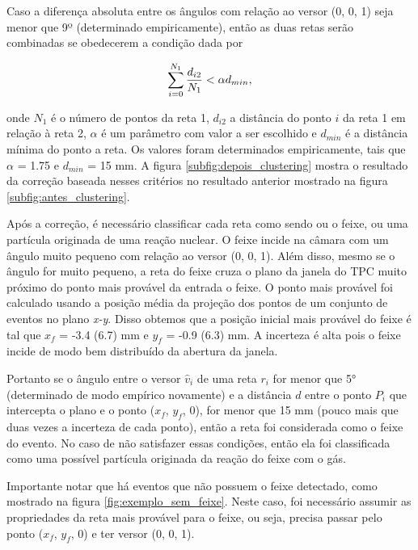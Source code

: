 \documentclass[a4paper,12pt,oneside]{book}
\begin{document}
\par Caso a diferença absoluta entre os ângulos com relação ao versor (0, 0, 1) seja menor que 9º (determinado empiricamente), então as duas retas serão combinadas se obedecerem a condição dada por

\begin{equation}\label{criterio_clustering}
    \sum_{i = 0}^{N_1}\frac{d_{i2}}{N_1} < \alpha \space d_{min}, 
\end{equation}

onde $N_1$ é o número de pontos da reta 1, $d_{i2}$ a distância do ponto $i$ da reta 1 em relação à reta 2, $\alpha$ é um parâmetro com valor a ser escolhido e $d_{min}$ é a distância mínima do ponto a reta. Os valores foram determinados empiricamente, tais que $\alpha$ = 1.75 e $d_{min}$ = 15 mm. A figura \ref{subfig:depois_clustering} mostra o resultado da correção baseada nesses critérios no resultado anterior mostrado na figura \ref{subfig:antes_clustering}.

\par Após a correção, é necessário classificar cada reta como sendo ou o feixe, ou uma partícula originada de uma reação nuclear. O feixe incide na câmara com um ângulo muito pequeno com relação ao versor (0, 0, 1). Além disso, mesmo se o ângulo for muito pequeno, a reta do feixe cruza o plano da janela do TPC muito próximo do ponto mais provável da entrada o feixe. O ponto mais provável foi calculado usando a posição média da projeção dos pontos de um conjunto de eventos no plano \textit{x-y}. Disso obtemos que a posição inicial mais provável do feixe é tal que $x_f$ = -3.4 (6.7) mm e $y_f$ = -0.9 (6.3) mm. A incerteza é alta pois o feixe incide de modo bem distribuído da abertura da janela.

\par Portanto se o ângulo entre o versor $\hat{v}_i$ de uma reta $r_i$ for menor que 5° (determinado de modo empírico novamente) e a distância $d$ entre o ponto $P_i$ que intercepta o plano e o ponto ($x_f$, $y_f$, 0), for menor que 15 mm (pouco mais que duas vezes a incerteza de cada ponto), então a reta foi considerada como o feixe do evento. No caso de não satisfazer essas condições, então ela foi classificada como uma possível partícula originada da reação do feixe com o gás.

\par Importante notar que há eventos que não possuem o feixe detectado, como mostrado na figura \ref{fig:exemplo_sem_feixe}. Neste caso, foi necessário assumir as propriedades da reta mais provável para o feixe, ou seja, precisa passar pelo ponto ($x_f$, $y_f$, 0) e ter versor (0, 0, 1).
\end{document}
